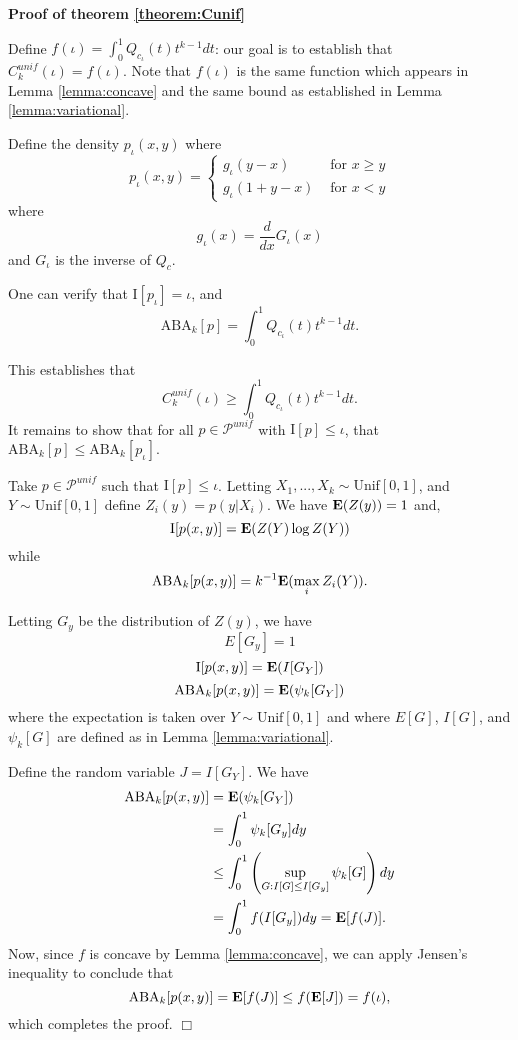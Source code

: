 \documentclass[12pt]{article}
\begin{document}
\textbf{Proof of theorem \ref{theorem:Cunif}}

Define $f(\iota) = \int_0^1 Q_{c_\iota}(t) t^{k-1} dt$: our goal is to
establish that $C^{unif}_k(\iota) = f(\iota)$.  Note that $f(\iota)$
is the same function which appears in Lemma \ref{lemma:concave} and
the same bound as established in Lemma \ref{lemma:variational}.

Define the density $p_\iota(x, y)$ where
\[
p_\iota(x, y) = \begin{cases}
g_\iota(y - x) & \text{ for } x\geq y\\
g_\iota(1 + y - x) & \text{ for } x < y
\end{cases}
\]
where
\[
g_\iota(x) = \frac{d}{dx}G_\iota(x)
\]
and $G_\iota$ is the inverse of $Q_c$.

One can verify that $\text{I}[p_\iota] = \iota$, and 
\[
\text{ABA}_k[p] = \int_0^1 Q_{c_\iota}(t) t^{k-1} dt.
\]

This establishes that
\[
C^{unif}_k(\iota) \geq \int_0^1 Q_{c_\iota}(t) t^{k-1} dt.
\]
It remains to show that for all $p \in \mathcal{P}^{unif}$ with
$\text{I}[p] \leq \iota$, that $\text{ABA}_k[p] \leq \text{ABA}_k[p_\iota]$.

Take $p \in \mathcal{P}^{unif}$ such that $\text{I}[p] \leq \iota$.
Letting $X_1,...,X_k \sim \text{Unif}[0,1]$, and $Y \sim \text{Unif}[0,1]$ define $Z_i(y) = p(y|X_i)$.
We have $\textbf{E}(Z(y)) = 1$ and,
\[
\text{I}[p(x,y)] = \textbf{E}(Z(Y) \log Z(Y))
\]
while
\[
\text{ABA}_k[p(x,y)] = k^{-1}\textbf{E}(\max_i Z_i(Y)).
\]

Letting $G_y$ be the distribution of $Z(y)$, we have
\[
E[G_y] = 1
\]
\[
\text{I}[p(x,y)] = \textbf{E}(I[G_Y])
\]
\[
\text{ABA}_k[p(x,y)] = \textbf{E}(\psi_k[G_Y])
\]
where the expectation is taken over $Y \sim \text{Unif}[0,1]$ and
where $E[G]$, $I[G]$, and $\psi_k[G]$ are defined as in
Lemma \ref{lemma:variational}.

Define the random variable $J = I[G_Y]$.
We have
\begin{align*}
\text{ABA}_k[p(x,y)] &= \textbf{E}(\psi_k[G_Y])
\\&= \int_0^1 \psi_k[G_y] dy
\\&\leq \int_0^1 \left(\sup_{G: I[G] \leq I[G_y]} \psi_k[G]\right) dy
\\&= \int_0^1 f(I[G_y]) dy = \textbf{E}[f(J)].
\end{align*}
Now, since $f$ is concave by Lemma \ref{lemma:concave},
we can apply Jensen's inequality to conclude that
\[
\text{ABA}_k[p(x,y)] = \textbf{E}[f(J)] \leq f(\textbf{E}[J]) = f(\iota),
\]
which completes the proof. $\Box$
\end{document}
